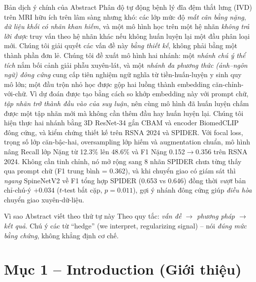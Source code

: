 \documentclass[12pt,a4paper]{article}
\begin{document}
\begin{dichbox}{Bản dịch ý chính của Abstract}
Phân độ tự động bệnh lý đĩa đệm thắt lưng (IVD) trên MRI hữu ích trên lâm sàng nhưng khó: các lớp mức độ \emph{mất cân bằng nặng}, \emph{dữ liệu khối có nhãn khan hiếm}, và một mô hình học trên một hệ nhãn \emph{không trả lời được} truy vấn theo hệ nhãn khác nếu không huấn luyện lại một đầu phân loại mới. Chúng tôi giải quyết các vấn đề này \emph{bằng thiết kế}, không phải bằng một thành phần đơn lẻ. Chúng tôi đề xuất mô hình hai nhánh: một \emph{nhánh chú ý thể tích} nắm bối cảnh giải phẫu xuyên-lát, và một \emph{nhánh đa phương thức (ảnh--ngôn ngữ) đông cứng} cung cấp tiên nghiệm ngữ nghĩa từ tiền-huấn-luyện y sinh quy mô lớn; một đầu trộn nhỏ học được gộp hai luồng thành embedding căn-chỉnh-với-chữ. Vì dự đoán được tạo bằng cách so khớp embedding này với prompt chữ, \emph{tập nhãn trở thành đầu vào của suy luận}, nên cùng mô hình đã huấn luyện chấm được một tập nhãn mới mà không cần thêm đầu hay huấn luyện lại. Chúng tôi hiện thực hai nhánh bằng 3D ResNet-34 gắn CBAM và encoder BiomedCLIP đông cứng, và kiểm chứng thiết kế trên RSNA 2024 và SPIDER. Với focal loss, trọng số lớp căn-bậc-hai, oversampling lớp hiếm và augmentation chuẩn, mô hình nâng Recall lớp Nặng từ 12.3\% lên 48.6\% và F1 Nặng 0.152$\to$0.356 trên RSNA 2024. Không cần tinh chỉnh, nó mở rộng sang 8 nhãn SPIDER chưa từng thấy qua prompt chữ (F1 trung bình = 0.362), và khi chuyển giao có giám sát thì \emph{ngang} SpineNetV2 về F1 tổng hợp SPIDER (0.653 vs 0.646) đồng thời \emph{vượt} bản chỉ-chú-ý $+0.034$ ($t$-test bắt cặp, $p=0.011$), gợi ý nhánh đông cứng giúp \emph{điều hòa} chuyển giao xuyên-dữ-liệu.
\end{dichbox}

\begin{keybox}{Vì sao Abstract viết theo thứ tự này}
Theo quy tắc: \emph{vấn đề $\to$ phương pháp $\to$ kết quả}. Chú ý các từ ``hedge'' (we interpret, regularizing signal) -- nói \emph{đúng mức bằng chứng}, không khẳng định cơ chế.
\end{keybox}

\section{Mục 1 -- Introduction (Giới thiệu)}
\end{document}
